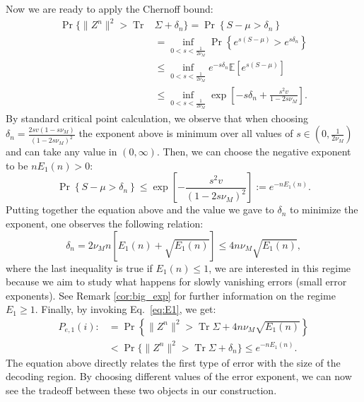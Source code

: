 \documentclass[10pt,conference]{IEEEtran}
\newcommand{\1}{\mathds{1}}
\DeclareMathOperator{\Tr}{Tr}
\newcommand{\EE}{\mathbb{E}}
\begin{document}
Now we are ready to apply the Chernoff bound:
\begin{equation*}
\begin{split}
\Pr \{\|Z^n\|^2>\Tr&\Sigma+\delta_n \}
=\Pr\left\{S-\mu>\delta_n \right\}\\
&=\inf_{0<s<\frac{1}{2\nu_M}}\Pr\left\{e^{s(S-\mu)}>e^{s\delta_n} \right\}\\
&\leq\inf_{0<s<\frac{1}{2\nu_M}} e^{-s\delta_n}\EE\left[e^{s(S-\mu)}\right]\\
&\leq\inf_{0<s<\frac{1}{2\nu_M}} \exp\left[-s\delta_n +\frac{s^2v}{1-2s\nu_M}\right].
\end{split}
\end{equation*}
By standard critical point calculation, we observe that when choosing $\delta_n=\frac{2sv(1-s\nu_M)}{(1-2s\nu_M)^2}$ the exponent above is minimum over all values of $s\in(0,\frac{1}{2\nu_M})$ and can take any value in $(0,\infty)$. Then, we can choose the negative exponent to be $nE_1(n)>0$:
\begin{equation*}
   \Pr\left\{S-\mu>\delta_n \right\}\leq\exp\left[-\frac{s^2v}{(1-2s\nu_M)^2}\right]:=e^{-nE_1(n)}.
\end{equation*}
Putting together the equation above and the value we gave to $\delta_n$ to minimize the exponent, one observes the following relation:
\begin{equation}\label{eq:delta_value}
    \delta_n=2\nu_Mn\left[E_1(n)+\sqrt{E_1(n)}\right]\leq4n\nu_M\sqrt{E_1(n)},
\end{equation}
where the last inequality is true if $E_1(n)\leq1$, we are interested in this regime because we aim to study what happens for slowly vanishing errors (small error exponents). See Remark \ref{cor:big_exp} for further information on the regime $E_1\geq1$. 
Finally, by invoking Eq.~\eqref{eq:E1}, we get:
\begin{equation}\label{eq:Pe1_bound}
\begin{split}
P_{e,1}(i):&=\Pr \left\{\|Z^n\|^2>\Tr\Sigma+4n\nu_M\sqrt{E_1(n)} \right\}\\
&<\Pr \{\|Z^n\|^2>\Tr\Sigma+\delta_n \}\leq e^{-nE_1(n)}.
\end{split}
\end{equation}
The equation above directly relates the first type of error with the size of the decoding region. By choosing different values of the error exponent, we can now see the tradeoff between these two objects in our construction.
\end{document}
